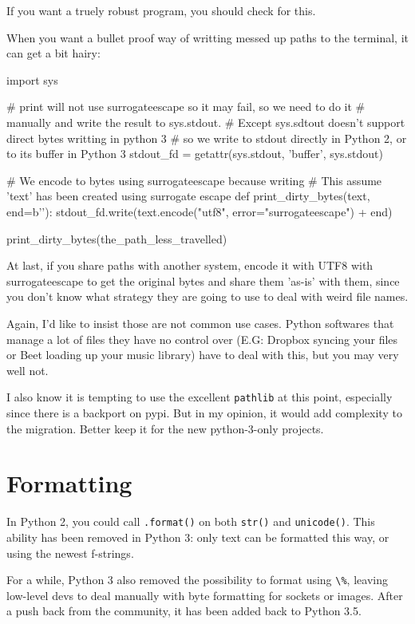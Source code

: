 \begin{py2}
\begin{py2}
\begin{py2}
\begin{py2}
If you want a truely robust program, you should check for this.

When you want a bullet proof way of writting messed up paths to the terminal, it can get a bit hairy:

\begin{py2and3}
import sys

# print will not use surrogateescape so it may fail, so we need to do it
# manually and write the result to sys.stdout.
# Except sys.sdtout doesn't support direct bytes writting in python 3
# so we write to stdout directly in Python 2, or to its buffer in Python 3
stdout_fd = getattr(sys.stdout, 'buffer', sys.stdout)

# We encode to bytes using surrogateescape because writing
# This assume 'text' has been created using surrogate escape
def print_dirty_bytes(text, end=b'\n'):
     stdout_fd.write(text.encode("utf8", error="surrogateescape") + end)

print_dirty_bytes(the_path_less_travelled)
\end{py2and3}

At last, if you share paths with another system, encode it with UTF8 with surrogateescape to get the original bytes and share them 'as-is' with them, since you don't know what strategy they are going to use to deal with weird file names.

Again, I'd like to insist those are not common use cases. Python softwares that manage a lot of files they have no control over (E.G: Dropbox syncing your files or Beet loading up your music library) have to deal with this, but you may very well not.

I also know it is tempting to use the excellent \lstinline{pathlib} at this point, especially since there is a backport on pypi. But in my opinion, it would add complexity to the migration. Better keep it for the new python-3-only projects.


\section{Formatting}

In Python 2, you could call \lstinline{.format()} on both \lstinline{str()} and \lstinline{unicode()}. This ability has been removed in Python 3: only text can be formatted this way, or using the newest f-strings.

For a while, Python 3 also removed the possibility to format using \lstinline{\%}, leaving low-level devs to deal manually with byte formatting for sockets or images. After a push back from the community, it has been added back to Python 3.5.


\end{py2}
\end{py2}
\end{py2}
\end{py2}
